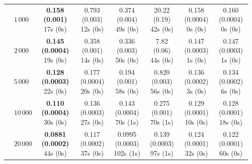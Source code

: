 \begin{table}[htbp]
{\begin{tabular}{llcccccc}
 & $1{\,}000$ & \makecell{\textbf{0.158 (0.001)} \\ \scriptsize 17s (0s)} & \makecell{0.793 (0.003) \\ \scriptsize 12s (0s)} & \makecell{0.374 (0.004) \\ \scriptsize 49s (0s)} & \makecell{20.22 (0.19) \\ \scriptsize 42s (0s)} & \makecell{0.158 (0.0004) \\ \scriptsize 0s (0s)} & \makecell{0.160 (0.0004) \\ \scriptsize 0s (0s)} \\
 & $2{\,}000$ & \makecell{\textbf{0.145 (0.0004)} \\ \scriptsize 19s (0s)} & \makecell{0.358 (0.001) \\ \scriptsize 14s (0s)} & \makecell{0.336 (0.003) \\ \scriptsize 50s (0s)} & \makecell{7.82 (0.06) \\ \scriptsize 44s (0s)} & \makecell{0.147 (0.0003) \\ \scriptsize 1s (0s)} & \makecell{0.147 (0.0003) \\ \scriptsize 1s (0s)} \\
 & $5{\,}000$ & \makecell{\textbf{0.128 (0.0003)} \\ \scriptsize 22s (0s)} & \makecell{0.177 (0.0004) \\ \scriptsize 20s (0s)} & \makecell{0.194 (0.001) \\ \scriptsize 58s (0s)} & \makecell{0.820 (0.003) \\ \scriptsize 56s (0s)} & \makecell{0.136 (0.0002) \\ \scriptsize 3s (0s)} & \makecell{0.134 (0.0002) \\ \scriptsize 6s (0s)} \\
 & $10{\,}000$ & \makecell{\textbf{0.110 (0.0004)} \\ \scriptsize 30s (0s)} & \makecell{0.136 (0.0003) \\ \scriptsize 27s (0s)} & \makecell{0.143 (0.0004) \\ \scriptsize 70s (1s)} & \makecell{0.275 (0.001) \\ \scriptsize 70s (1s)} & \makecell{0.129 (0.0001) \\ \scriptsize 10s (0s)} & \makecell{0.128 (0.0001) \\ \scriptsize 18s (0s)} \\
 & $20{\,}000$ & \makecell{\textbf{0.0881 (0.0002)} \\ \scriptsize 44s (0s)} & \makecell{0.117 (0.0002) \\ \scriptsize 37s (0s)} & \makecell{0.0995 (0.0003) \\ \scriptsize 102s (1s)} & \makecell{0.139 (0.0003) \\ \scriptsize 97s (1s)} & \makecell{0.124 (0.0001) \\ \scriptsize 32s (0s)} & \makecell{0.122 (0.0001) \\ \scriptsize 60s (0s)} \\
\hline
\end{tabular}%
}
\end{table}
